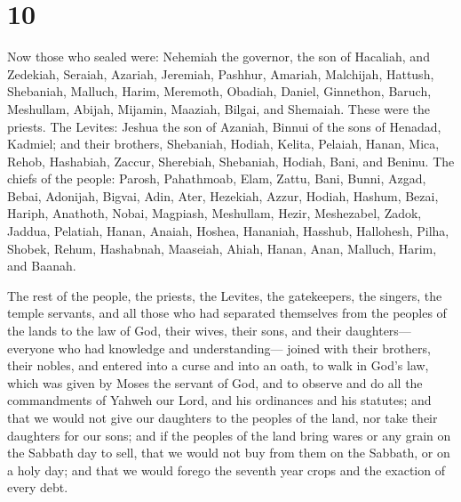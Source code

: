 \hypertarget{section-9}{%
\section{10}\label{section-9}}

 Now those who sealed were: Nehemiah the governor, the son
of Hacaliah, and Zedekiah,  Seraiah, Azariah, Jeremiah,
 Pashhur, Amariah, Malchijah,  Hattush,
Shebaniah, Malluch,  Harim, Meremoth, Obadiah,
 Daniel, Ginnethon, Baruch,  Meshullam,
Abijah, Mijamin,  Maaziah, Bilgai, and Shemaiah. These
were the priests.  The Levites: Jeshua the son of Azaniah,
Binnui of the sons of Henadad, Kadmiel;  and their
brothers, Shebaniah, Hodiah, Kelita, Pelaiah, Hanan, 
Mica, Rehob, Hashabiah,  Zaccur, Sherebiah, Shebaniah,
 Hodiah, Bani, and Beninu.  The chiefs of
the people: Parosh, Pahathmoab, Elam, Zattu, Bani, 
Bunni, Azgad, Bebai,  Adonijah, Bigvai, Adin,
 Ater, Hezekiah, Azzur,  Hodiah, Hashum,
Bezai,  Hariph, Anathoth, Nobai, 
Magpiash, Meshullam, Hezir,  Meshezabel, Zadok, Jaddua,
 Pelatiah, Hanan, Anaiah,  Hoshea,
Hananiah, Hasshub,  Hallohesh, Pilha, Shobek,
 Rehum, Hashabnah, Maaseiah,  Ahiah,
Hanan, Anan,  Malluch, Harim, and Baanah.

 The rest of the people, the priests, the Levites, the
gatekeepers, the singers, the temple servants, and all those who had
separated themselves from the peoples of the lands to the law of God,
their wives, their sons, and their daughters---everyone who had
knowledge and understanding---  joined with their
brothers, their nobles, and entered into a curse and into an oath, to
walk in God's law, which was given by Moses the servant of God, and to
observe and do all the commandments of Yahweh our Lord, and his
ordinances and his statutes;  and that we would not give
our daughters to the peoples of the land, nor take their daughters for
our sons;  and if the peoples of the land bring wares or
any grain on the Sabbath day to sell, that we would not buy from them on
the Sabbath, or on a holy day; and that we would forego the seventh year
crops and the exaction of every debt.

